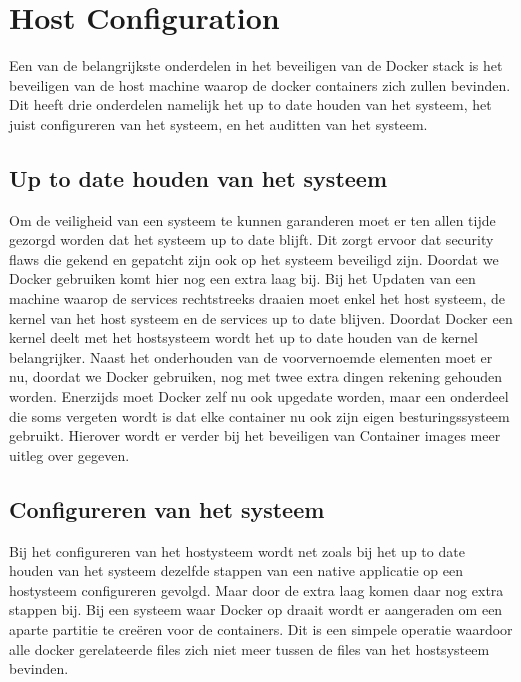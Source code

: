 \section{Host Configuration}

Een van de belangrijkste onderdelen in het beveiligen van de Docker stack is het beveiligen van de host machine waarop de docker containers zich zullen bevinden. Dit heeft drie onderdelen namelijk het up to date houden van het systeem, het juist configureren van het systeem, en het auditten van het systeem.

\subsection{Up to date houden van het systeem}

Om de veiligheid van een systeem te kunnen garanderen moet er ten allen tijde gezorgd worden dat het systeem up to date blijft. Dit zorgt ervoor dat security flaws die gekend en gepatcht zijn ook op het systeem beveiligd zijn. Doordat we Docker gebruiken komt hier nog een extra laag bij. Bij het Updaten van een machine waarop de services rechtstreeks draaien moet enkel het host systeem, de kernel van het host systeem en de services up to date blijven. Doordat Docker een kernel deelt met het hostsysteem wordt het up to date houden van de kernel belangrijker. Naast het onderhouden van de voorvernoemde elementen moet er nu, doordat we Docker gebruiken, nog met twee extra dingen rekening gehouden worden. Enerzijds moet Docker zelf nu ook upgedate worden, maar een onderdeel die soms vergeten wordt is dat elke container nu ook zijn eigen besturingssysteem gebruikt. Hierover wordt er verder bij het beveiligen van Container images meer uitleg over gegeven.


\subsection{Configureren van het systeem}

Bij het configureren van het hostysteem wordt net zoals bij het up to date houden van het systeem dezelfde stappen van een native applicatie op een hostysteem configureren gevolgd. Maar door de extra laag komen daar nog extra stappen bij. Bij een systeem waar Docker op draait wordt er aangeraden om een aparte partitie te creëren voor de containers. Dit is een simpele operatie waardoor alle docker gerelateerde files zich niet meer tussen de files van het hostsysteem bevinden.

